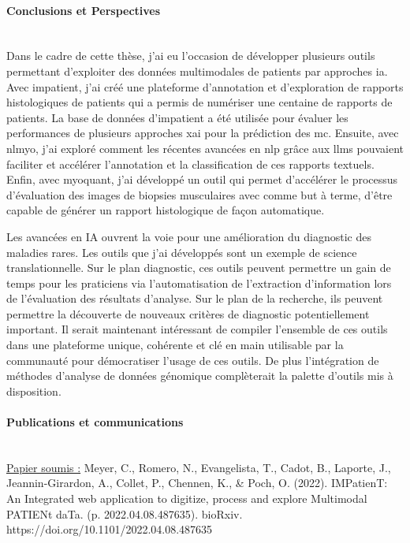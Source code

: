 \paragraph{\textbf{Conclusions et Perspectives}}\mbox{}\\

Dans le cadre de cette thèse, j’ai eu l’occasion de développer plusieurs outils permettant d’exploiter des données multimodales de patients par approches \gls{ia}. Avec \gls{impatient}, j’ai créé une plateforme d’annotation et d’exploration de rapports histologiques de patients qui a permis de numériser une centaine de rapports de patients. La base de données d'\gls{impatient} a été utilisée pour évaluer les performances de plusieurs approches \gls{xai} pour la prédiction des \gls{mc}. Ensuite, avec \gls{nlmyo}, j’ai exploré comment les récentes avancées en \gls{nlp} grâce aux \gls{llms} pouvaient faciliter et accélérer l’annotation et la classification de ces rapports textuels. Enfin, avec \gls{myoquant}, j’ai développé un outil qui permet d’accélérer le processus d’évaluation des images de biopsies musculaires avec comme but à terme, d’être capable de générer un rapport histologique de façon automatique.

Les avancées en IA ouvrent la voie pour une amélioration du diagnostic des maladies rares. Les outils que j’ai développés sont un exemple de science translationnelle. Sur le plan diagnostic, ces outils peuvent permettre un gain de temps pour les praticiens via l’automatisation de l’extraction d’information lors de l’évaluation des résultats d’analyse. Sur le plan de la recherche, ils peuvent permettre la découverte de nouveaux critères de diagnostic potentiellement important. Il serait maintenant intéressant de compiler l’ensemble de ces outils dans une plateforme unique, cohérente et clé en main utilisable par la communauté pour démocratiser l’usage de ces outils. De plus l’intégration de méthodes d’analyse de données génomique complèterait la palette d’outils mis à disposition.



\paragraph{\textbf{Publications et communications}}\mbox{}\\

\underline{Papier soumis :} Meyer, C., Romero, N., Evangelista, T., Cadot, B., Laporte, J., Jeannin-Girardon, A., Collet, P., Chennen, K., \& Poch, O. (2022). IMPatienT: An Integrated web application to digitize, process and explore Multimodal PATIENt daTa. (p. 2022.04.08.487635). bioRxiv. https://doi.org/10.1101/2022.04.08.487635

